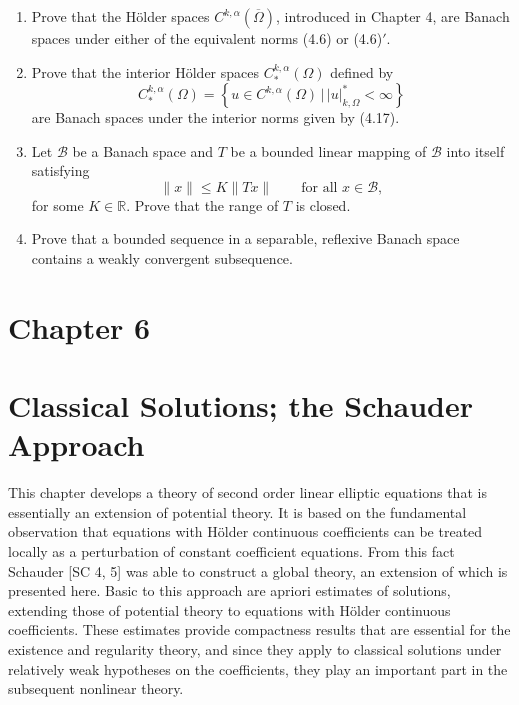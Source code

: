 \begin{enumerate}
\item[\textbf{5.1.}] Prove that the H\"older spaces $C^{k,\alpha}(\overline{\Omega})$, introduced in Chapter 4, are Banach spaces under either of the equivalent norms (4.6) or (4.6)$'$.
\item[\textbf{5.2.}] Prove that the interior H\"older spaces $C^{k,\alpha}_{*}(\Omega)$ defined by
\[
C^{k,\alpha}_{*}(\Omega)=\left\{u \in C^{k,\alpha}(\Omega)\,|\,|u|^{*}_{k,\Omega}<\infty\right\}
\]
are Banach spaces under the interior norms given by (4.17).
\item[\textbf{5.3.}] Let $\mathcal{B}$ be a Banach space and $T$ be a bounded linear mapping of $\mathcal{B}$ into itself satisfying
\[
\|x\| \leq K \|Tx\| \qquad \text{for all } x \in \mathcal{B},
\]
for some $K \in \mathbb{R}$. Prove that the range of $T$ is closed.
\item[\textbf{5.4.}] Prove that a bounded sequence in a separable, reflexive Banach space contains a weakly convergent subsequence.
\end{enumerate}

\section*{Chapter 6}

\section*{Classical Solutions; the Schauder Approach}

This chapter develops a theory of second order linear elliptic equations that is essentially an extension of potential theory. It is based on the fundamental observation that equations with H\"older continuous coefficients can be treated locally as a perturbation of constant coefficient equations. From this fact Schauder [SC 4, 5] was able to construct a global theory, an extension of which is presented here. Basic to this approach are apriori estimates of solutions, extending those of potential theory to equations with H\"older continuous coefficients. These estimates provide compactness results that are essential for the existence and regularity theory, and since they apply to classical solutions under relatively weak hypotheses on the coefficients, they play an important part in the subsequent nonlinear theory.


